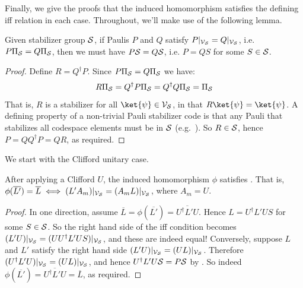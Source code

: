 Finally, we give the proofs that the induced homomorphism satisfies the defining iff relation  in each case.
Throughout, we'll make use of the following lemma.

\begin{lemma}\label{lem:paulis_equal_on_codespace_are_equal_up_to_stabilizer}
    Given stabilizer group $\mathcal{S}$, if Paulis $P$ and $Q$ satisfy $P|_{\mathcal{V}_{\mathcal{S}}} = Q|_{\mathcal{V}_{\mathcal{S}}}$, i.e. $P \Pi_{\mathcal{S}} = Q \Pi_{\mathcal{S}}$, then we must have $P\mathcal{S} = Q\mathcal{S}$, i.e. $P = QS$ for some $S \in \mathcal{S}$.
    \begin{proof}
        Define $R = Q^\dagger P$.
        Since $P \Pi_{\mathcal{S}} = Q \Pi_{\mathcal{S}}$ we have:
        \begin{equation}
            R \Pi_{\mathcal{S}} = Q^\dagger P \Pi_{\mathcal{S}} = Q^\dagger Q \Pi_{\mathcal{S}} = \Pi_{\mathcal{S}}
        \end{equation}
        That is, $R$ is a stabilizer for all $\ket{\psi} \in \VVV_\SSS$, in that $R\ket{\psi} = \ket{\psi}$.
        A defining property of a non-trivial Pauli stabilizer code is that any Pauli that stabilizes all codespace elements must be in $\mathcal{S}$ (e.g.\ ).
        So $R \in \mathcal{S}$, hence $P = QQ^\dagger P = QR$, as required.
    \end{proof}
\end{lemma}

We start with the Clifford unitary case.

\begin{proposition}
    After applying a Clifford $U$, the induced homomorphism $\phi$ satisfies .
    That is, $\phi(\overline{L'}) = \overline{L} \iff (L' A_m)|_{\mathcal{V}_{\mathcal{S}}} = (A_m L)|_{\mathcal{V}_{\mathcal{S}}}$, where $A_m = U$.
    \begin{proof}
        In one direction, assume $\overline{L} = \phi(\overline{L'}) = \overline{U^\dagger L' U}$.
        Hence $L = U^\dagger L' U S$ for some $S \in \mathcal{S}$.
        So the right hand side of the iff condition becomes $(L' U)|_{\mathcal{V}_{\mathcal{S}}} = (U U^\dagger L' U S)|_{\mathcal{V}_{\mathcal{S}}}$, and these are indeed equal!
        Conversely, suppose $L$ and $L'$ satisfy the right hand side $(L' U)|_{\mathcal{V}_{\mathcal{S}}} = (U L)|_{\mathcal{V}_{\mathcal{S}}}$.
        Therefore $(U^\dagger L' U)|_{\mathcal{V}_{\mathcal{S}}} = (U L)|_{\mathcal{V}_{\mathcal{S}}}$,
        and hence $U^\dagger L' U \mathcal{S} = P \mathcal{S}$ by .
        So indeed $\phi(\overline{L'}) = \overline{U^\dagger L' U} = \overline{L}$, as required.
    \end{proof}
\end{proposition}

